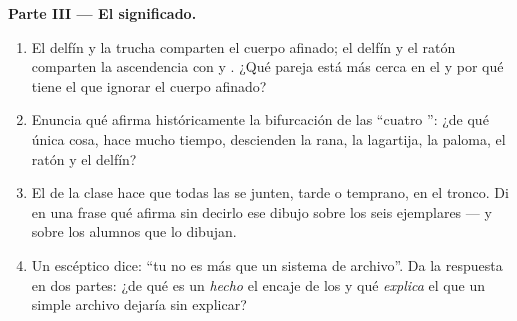 \begin{problem}
\medskip\noindent\textbf{Parte III --- El significado.}
\begin{enumerate}[resume]
  \item El delfín y la trucha comparten el cuerpo afinado; el delfín y
        el ratón comparten la ascendencia con  y . ¿Qué pareja
        está más cerca en el  y por qué tiene el  que ignorar
        el cuerpo afinado?
  \item Enuncia qué afirma históricamente la bifurcación de las
        ``cuatro '': ¿de qué única cosa, hace mucho
        tiempo, descienden la rana, la lagartija, la paloma, el ratón y
        el delfín?
  \item El  de la clase hace que todas las  se junten, tarde
        o temprano, en el tronco. Di en una frase qué afirma sin
        decirlo ese dibujo sobre los seis ejemplares --- y sobre los
        alumnos que lo dibujan.
  \item Un escéptico dice: ``tu  no es más que un sistema de
        archivo''. Da la respuesta en dos partes: ¿de qué es un
        \emph{hecho} el encaje de los  y qué \emph{explica} el
         que un simple archivo dejaría sin explicar?
\end{enumerate}
\end{problem}
